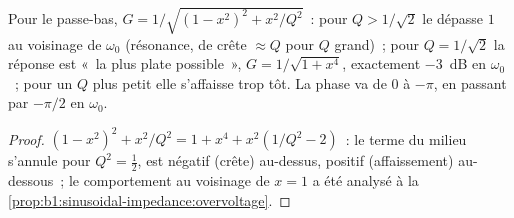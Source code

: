 \begin{proposition}\label{prop:b1:filters-transfer-functions:lowpass2}
Pour le passe-bas, $G = 1/\sqrt{(1 - x^2)^2 + x^2/Q^2}$~: pour
$Q > 1/\sqrt2$ le  dépasse $1$ au voisinage de $\omega_0$
(résonance, de crête $\approx Q$ pour $Q$ grand)~; pour $Q = 1/\sqrt2$
la réponse est «~la plus plate possible~», $G = 1/\sqrt{1 + x^4}$,
exactement \qty{-3}{dB} en $\omega_0$~; pour un $Q$ plus petit elle
s'affaisse trop tôt. La phase va de $0$ à $-\pi$, en passant par
$-\pi/2$ en $\omega_0$.
\end{proposition}

\begin{proof}
$(1 - x^2)^2 + x^2/Q^2 = 1 + x^4 + x^2(1/Q^2 - 2)$~: le terme du milieu
s'annule pour $Q^2 = \tfrac12$, est négatif (crête) au-dessus, positif
(affaissement) au-dessous~; le comportement au voisinage de $x = 1$ a
été analysé à la \cref{prop:b1:sinusoidal-impedance:overvoltage}.
\end{proof}

